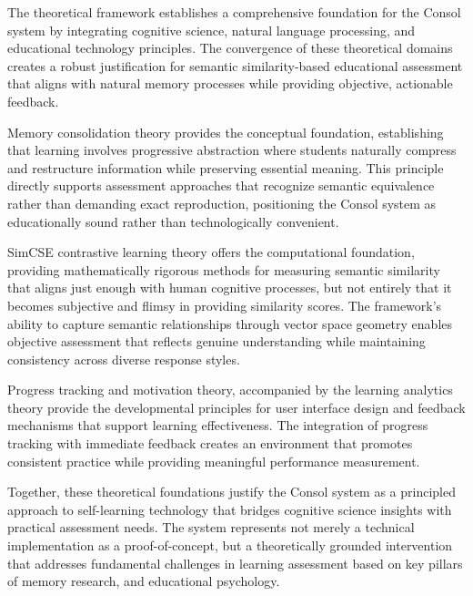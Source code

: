 
{\color{maroon}
The theoretical framework establishes a comprehensive foundation for the Consol system by integrating cognitive science, natural language processing, and educational technology principles. The convergence of these theoretical domains creates a robust justification for semantic similarity-based educational assessment that aligns with natural memory processes while providing objective, actionable feedback.

Memory consolidation theory provides the conceptual foundation, establishing that learning involves progressive abstraction where students naturally compress and restructure information while preserving essential meaning. This principle directly supports assessment approaches that recognize semantic equivalence rather than demanding exact reproduction, positioning the Consol system as educationally sound rather than technologically convenient.

SimCSE contrastive learning theory offers the computational foundation, providing mathematically rigorous methods for measuring semantic similarity that aligns just enough with human cognitive processes, but not entirely that it becomes subjective and flimsy in providing similarity scores. The framework's ability to capture semantic relationships through vector space geometry enables objective assessment that reflects genuine understanding while maintaining consistency across diverse response styles.

Progress tracking and motivation theory, accompanied by the learning analytics theory provide the developmental principles for user interface design and feedback mechanisms that support learning effectiveness. The integration of progress tracking with immediate feedback creates an environment that promotes consistent practice while providing meaningful performance measurement.

Together, these theoretical foundations justify the Consol system as a principled approach to self-learning technology that bridges cognitive science insights with practical assessment needs. The system represents not merely a technical implementation as a proof-of-concept, but a theoretically grounded intervention that addresses fundamental challenges in learning assessment based on key pillars of memory research, and educational psychology.
}
